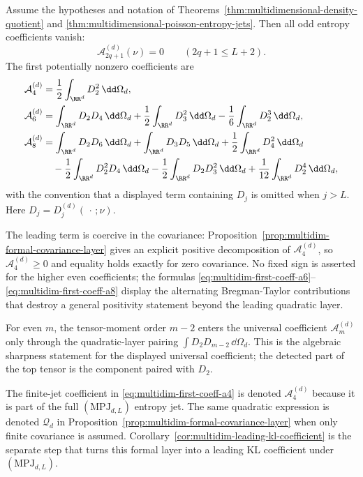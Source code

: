 \begin{lemma}%
\label{lem:multidim-parity-low-order-display}
Assume the hypotheses and notation of
Theorems~\ref{thm:multidimensional-density-quotient} and
\ref{thm:multidimensional-poisson-entropy-jets}.  Then all odd entropy
coefficients vanish:
\begin{equation}\label{eq:multidim-odd-parity-cancellation}
\mathcal A_{2q+1}^{(d)}(\nu)=0
\qquad(2q+1\le L+2).
\end{equation}
The first potentially nonzero coefficients are
\begin{align}
\mathcal A_4^{(d)}
&=\frac12\int_{\RR^d}D_2^2\,\dd\Omega_d,
\label{eq:multidim-first-coeff-a4}\\
\mathcal A_6^{(d)}
&=\int_{\RR^d}D_2D_4\,\dd\Omega_d
+\frac12\int_{\RR^d}D_3^2\,\dd\Omega_d
-\frac16\int_{\RR^d}D_2^3\,\dd\Omega_d,
\label{eq:multidim-first-coeff-a6}\\
\mathcal A_8^{(d)}
&=\int_{\RR^d}D_2D_6\,\dd\Omega_d
+\int_{\RR^d}D_3D_5\,\dd\Omega_d
+\frac12\int_{\RR^d}D_4^2\,\dd\Omega_d
\notag\\
&\quad
-\frac12\int_{\RR^d}D_2^2D_4\,\dd\Omega_d
-\frac12\int_{\RR^d}D_2D_3^2\,\dd\Omega_d
+\frac1{12}\int_{\RR^d}D_2^4\,\dd\Omega_d,
\label{eq:multidim-first-coeff-a8}
\end{align}
with the convention that a displayed term containing \(D_j\) is omitted when
\(j>L\).  Here \(D_j=D_j^{(d)}(\,\cdot\,;\nu)\).

The leading term is coercive in the covariance:
Proposition~\ref{prop:multidim-formal-covariance-layer} gives an explicit positive
decomposition of \(\mathcal A_4^{(d)}\), so
\(\mathcal A_4^{(d)}\ge0\) and equality holds exactly for zero covariance.
No fixed sign is asserted for the higher even coefficients; the formulas
\eqref{eq:multidim-first-coeff-a6}--\eqref{eq:multidim-first-coeff-a8}
display the alternating Bregman-Taylor contributions that destroy a general
positivity statement beyond the leading quadratic layer.

For even \(m\), the tensor-moment order \(m-2\) enters the universal
coefficient \(\mathcal A_m^{(d)}\) only through the quadratic-layer pairing
\(\int D_2D_{m-2}\,\dd\Omega_d\).  This is the algebraic sharpness statement
for the displayed universal coefficient; the detected part of the top tensor
is the component paired with \(D_2\).
\end{lemma}

\begin{remark}
The finite-jet coefficient in
\eqref{eq:multidim-first-coeff-a4} is denoted
\(\mathcal A_4^{(d)}\) because it is part of the full
\((\mathrm{MPJ}_{d,L})\) entropy jet.  The same quadratic expression is
denoted \(\mathcal Q_d\) in
Proposition~\ref{prop:multidim-formal-covariance-layer} when only finite
covariance is assumed.  Corollary~\ref{cor:multidim-leading-kl-coefficient}
is the separate step that turns this formal layer into a leading KL coefficient
under \((\mathrm{MPJ}_{d,L})\).
\end{remark}

